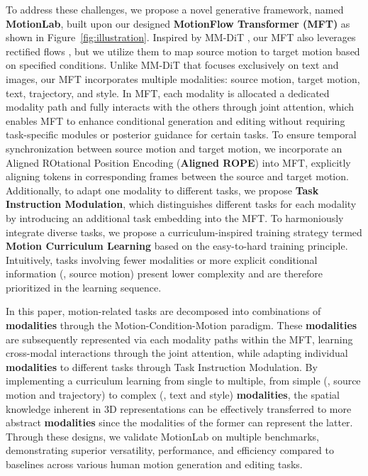 To address these challenges, we propose a novel generative framework, named \textbf{MotionLab}, built upon our designed \textbf{MotionFlow Transformer (MFT)} as shown in Figure~\ref{fig:illustration}. Inspired by MM-DiT \cite{esser2024scaling}, our MFT also leverages rectified flows \cite{liu2022flow,lipman2022flow}, but we utilize them to map source motion to target motion based on specified conditions. Unlike MM-DiT that focuses exclusively on text and images, our MFT incorporates multiple modalities: source motion, target motion, text, trajectory, and style. In MFT, each modality is allocated a dedicated modality path and fully interacts with the others through joint attention, which enables MFT to enhance conditional generation and editing without requiring task-specific modules or posterior guidance for certain tasks. To ensure temporal synchronization between source motion and target motion, we incorporate an Aligned ROtational Position Encoding (\textbf{Aligned ROPE}) into MFT, explicitly aligning tokens in corresponding frames between the source and target motion. Additionally, to adapt one modality to different tasks, we propose \textbf{Task Instruction Modulation}, which distinguishes different tasks for each modality by introducing an additional task embedding into the MFT. To harmoniously integrate diverse tasks, we propose a curriculum-inspired training strategy termed \textbf{Motion Curriculum Learning} based on the easy-to-hard training principle. Intuitively, tasks involving fewer modalities or more explicit conditional information (\eg, source motion) present lower complexity and are therefore prioritized in the learning sequence.

In this paper, motion-related tasks are decomposed into combinations of \textbf{modalities} through the Motion-Condition-Motion paradigm. These \textbf{modalities} are subsequently represented via each modality paths within the MFT, learning cross-modal interactions through the joint attention, while adapting individual \textbf{modalities} to different tasks through Task Instruction Modulation. By implementing a curriculum learning from single to multiple, from simple (\eg, source motion and trajectory) to complex (\eg, text and style) \textbf{modalities}, the spatial knowledge inherent in 3D representations can be effectively transferred to more abstract \textbf{modalities} since the modalities of the former can represent the latter.
Through these designs, we validate MotionLab on multiple benchmarks, demonstrating superior versatility, performance, and efficiency compared to baselines across various human motion generation and editing tasks.


